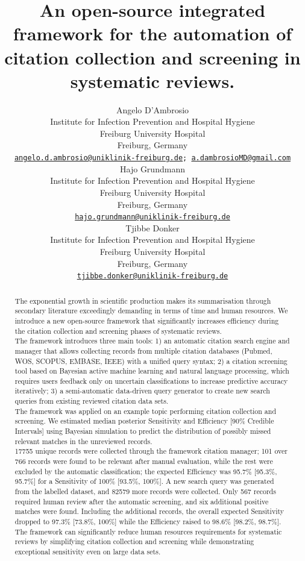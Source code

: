 \documentclass{article}
\title{An open-source integrated framework for the automation of
citation collection and screening in systematic reviews.}
\author{
    Angelo D'Ambrosio
   \\
    Institute for Infection Prevention and Hospital Hygiene \\
    Freiburg University Hospital \\
  Freiburg, Germany \\
  \texttt{\href{mailto:angelo.d.ambrosio@uniklinik-freiburg.de}{\nolinkurl{angelo.d.ambrosio@uniklinik-freiburg.de}};
\href{mailto:a.dambrosioMD@gmail.com}{\nolinkurl{a.dambrosioMD@gmail.com}}} \\
   \And
    Hajo Grundmann
   \\
    Institute for Infection Prevention and Hospital Hygiene \\
    Freiburg University Hospital \\
  Freiburg, Germany \\
  \texttt{\href{mailto:hajo.grundmann@uniklinik-freiburg.de}{\nolinkurl{hajo.grundmann@uniklinik-freiburg.de}}} \\
   \And
    Tjibbe Donker
   \\
    Institute for Infection Prevention and Hospital Hygiene \\
    Freiburg University Hospital \\
  Freiburg, Germany \\
  \texttt{\href{mailto:tjibbe.donker@uniklinik-freiburg.de}{\nolinkurl{tjibbe.donker@uniklinik-freiburg.de}}} \\
  }
\begin{document}
\maketitle

\def\tightlist{}


\begin{abstract}
The exponential growth in scientific production makes its summarisation
through secondary literature exceedingly demanding in terms of time and
human resources. We introduce a new open-source framework that
significantly increases efficiency during the citation collection and
screening phases of systematic reviews.\\
The framework introduces three main tools: 1) an automatic citation
search engine and manager that allows collecting records from multiple
citation databases (Pubmed, WOS, SCOPUS, EMBASE, IEEE) with a unified
query syntax; 2) a citation screening tool based on Bayesian active
machine learning and natural language processing, which requires users
feedback only on uncertain classifications to increase predictive
accuracy iteratively; 3) a semi-automatic data-driven query generator to
create new search queries from existing reviewed citation data sets.\\
The framework was applied on an example topic performing citation
collection and screening. We estimated median posterior Sensitivity and
Efficiency {[}90\% Credible Intervals{]} using Bayesian simulation to
predict the distribution of possibly missed relevant matches in the
unreviewed records.\\
17755 unique records were collected through the framework citation
manager; 101 over 766 records were found to be relevant after manual
evaluation, while the rest were excluded by the automatic
classification; the expected Efficiency was 95.7\% {[}95.3\%, 95.7\%{]}
for a Sensitivity of 100\% {[}93.5\%, 100\%{]}. A new search query was
generated from the labelled dataset, and 82579 more records were
collected. Only 567 records required human review after the automatic
screening, and six additional positive matches were found. Including the
additional records, the overall expected Sensitivity dropped to 97.3\%
{[}73.8\%, 100\%{]} while the Efficiency raised to 98.6\% {[}98.2\%,
98.7\%{]}.\\
The framework can significantly reduce human resources requirements for
systematic reviews by simplifying citation collection and screening
while demonstrating exceptional sensitivity even on large data sets.
\end{abstract}
\end{document}
